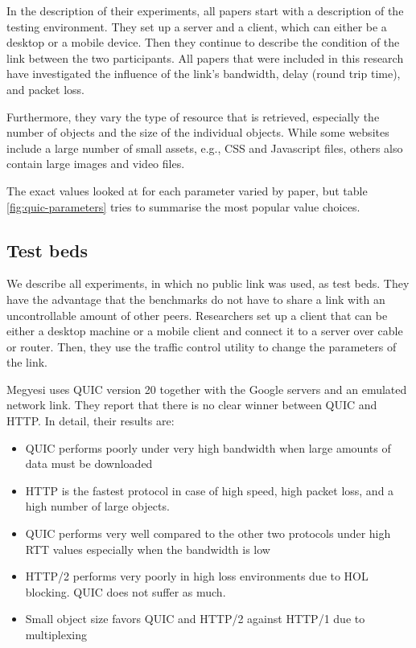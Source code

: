\documentclass[conference]{IEEEtran}
\begin{document}
In the description of their experiments, all papers start with a description of the testing environment. They set up a server and a client, which can either be a desktop or a mobile device. Then they continue to describe the condition of the link between the two participants. All papers that were included in this research have investigated the influence of the link's bandwidth, delay (round trip time), and packet loss. 

Furthermore, they vary the type of resource that is retrieved, especially the number of objects and the size of the individual objects. While some websites include a large number of small assets, e.g., CSS and Javascript files, others also contain large images and video files.

The exact values looked at for each parameter varied by paper, but table \ref{fig:quic-parameters} tries to summarise the most popular value choices.


\subsection{Test beds}

We describe all experiments, in which no public link was used, as test beds. They have the advantage that the benchmarks do not have to share a link with an uncontrollable amount of other peers. Researchers set up a client that can be either a desktop machine or a mobile client and connect it to a server over cable or router. Then, they use the traffic control utility to change the parameters of the link. 

Megyesi \cite{HowQuickIsQuic} uses QUIC version 20 together with the Google servers and an emulated network link. They report that there is no clear winner between QUIC and HTTP. In detail, their results are:

\begin{itemize}
\item QUIC performs poorly under very high bandwidth when large amounts of data must be downloaded
\item HTTP is the fastest protocol in case of high speed, high packet loss, and a high number of large objects.
\item QUIC performs very well compared to the other two protocols under high RTT values especially when the bandwidth is low
\item HTTP/2 performs very poorly in high loss environments due to HOL blocking. QUIC does not suffer as much.
\item Small object size favors QUIC and HTTP/2 against HTTP/1 due to multiplexing
\end{itemize} 
\end{document}
